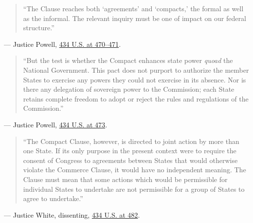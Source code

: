 \documentclass[12pt]{article}
\begin{document}
\begin{quote}
``The Clause reaches both `agreements' and `compacts,' the formal as well as the informal. The relevant inquiry must be one of impact on our federal structure.''
\end{quote}
\noindent --- Justice Powell, \href{https://supreme.justia.com/cases/federal/us/434/452/}{434 U.S. at 470--471}.

\begin{quote}
``But the test is whether the Compact enhances state power \textit{quoad} the National Government. This pact does not purport to authorize the member States to exercise any powers they could not exercise in its absence. Nor is there any delegation of sovereign power to the Commission; each State retains complete freedom to adopt or reject the rules and regulations of the Commission.''
\end{quote}
\noindent --- Justice Powell, \href{https://supreme.justia.com/cases/federal/us/434/452/}{434 U.S. at 473}.

\begin{quote}
``The Compact Clause, however, is directed to joint action by more than one State. If its only purpose in the present context were to require the consent of Congress to agreements between States that would otherwise violate the Commerce Clause, it would have no independent meaning. The Clause must mean that some actions which would be permissible for individual States to undertake are not permissible for a group of States to agree to undertake.''
\end{quote}
\noindent --- Justice White, dissenting, \href{https://www.law.cornell.edu/supremecourt/text/434/452}{434 U.S. at 482}.
\end{document}
